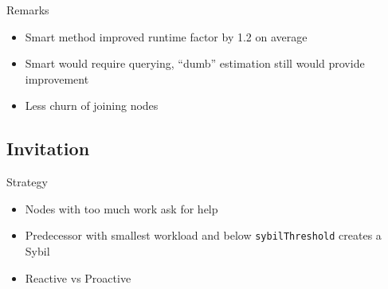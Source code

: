 \documentclass[11pt]{beamer}
\begin{document}
\begin{frame}{Remarks}
	\begin{itemize}
		\item Smart method improved runtime factor by 1.2 on average
		\item Smart would require querying, ``dumb'' estimation still would provide improvement
		\item Less churn of joining nodes
	\end{itemize}
\end{frame}

\subsection{Invitation}
\begin{frame}{Strategy}
	\begin{itemize}
		\item Nodes with too much work ask for help
		\item Predecessor with smallest workload and below \texttt{sybilThreshold} creates a Sybil
		\item Reactive vs Proactive
	\end{itemize}
\end{frame}

\end{document}
